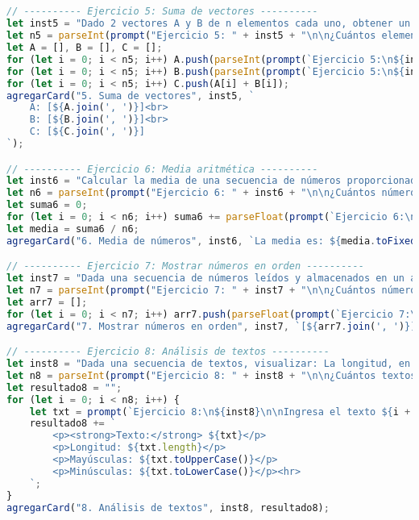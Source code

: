 \documentclass[10pt,a4paper]{article}
\begin{document}
\subsection{\color{colorESCOM}{Código JavaScript (Parte 2)}}
\begin{lstlisting}[language=JavaScript]
// ---------- Ejercicio 5: Suma de vectores ----------
let inst5 = "Dado 2 vectores A y B de n elementos cada uno, obtener un arreglo C con A[i] + B[i].";
let n5 = parseInt(prompt("Ejercicio 5: " + inst5 + "\n\n¿Cuántos elementos tendrán los vectores?"));
let A = [], B = [], C = [];
for (let i = 0; i < n5; i++) A.push(parseInt(prompt(`Ejercicio 5:\n${inst5}\n\nVector A - Elemento ${i + 1}:`)));
for (let i = 0; i < n5; i++) B.push(parseInt(prompt(`Ejercicio 5:\n${inst5}\n\nVector B - Elemento ${i + 1}:`)));
for (let i = 0; i < n5; i++) C.push(A[i] + B[i]);
agregarCard("5. Suma de vectores", inst5, `
    A: [${A.join(', ')}]<br>
    B: [${B.join(', ')}]<br>
    C: [${C.join(', ')}]
`);

// ---------- Ejercicio 6: Media aritmética ----------
let inst6 = "Calcular la media de una secuencia de números proporcionada por el usuario.";
let n6 = parseInt(prompt("Ejercicio 6: " + inst6 + "\n\n¿Cuántos números vas a ingresar?"));
let suma6 = 0;
for (let i = 0; i < n6; i++) suma6 += parseFloat(prompt(`Ejercicio 6:\n${inst6}\n\nIngresa el número ${i + 1}:`));
let media = suma6 / n6;
agregarCard("6. Media de números", inst6, `La media es: ${media.toFixed(2)}`);

// ---------- Ejercicio 7: Mostrar números en orden ----------
let inst7 = "Dada una secuencia de números leídos y almacenados en un arreglo [A], mostrar dichos números en orden.";
let n7 = parseInt(prompt("Ejercicio 7: " + inst7 + "\n\n¿Cuántos números vas a ingresar?"));
let arr7 = [];
for (let i = 0; i < n7; i++) arr7.push(parseFloat(prompt(`Ejercicio 7:\n${inst7}\n\nIngresa el número ${i + 1}:`)));
agregarCard("7. Mostrar números en orden", inst7, `[${arr7.join(', ')}]`);

// ---------- Ejercicio 8: Análisis de textos ----------
let inst8 = "Dada una secuencia de textos, visualizar: La longitud, en mayúsculas y en minúsculas.";
let n8 = parseInt(prompt("Ejercicio 8: " + inst8 + "\n\n¿Cuántos textos vas a ingresar?"));
let resultado8 = "";
for (let i = 0; i < n8; i++) {
    let txt = prompt(`Ejercicio 8:\n${inst8}\n\nIngresa el texto ${i + 1}:`);
    resultado8 += `
        <p><strong>Texto:</strong> ${txt}</p>
        <p>Longitud: ${txt.length}</p>
        <p>Mayúsculas: ${txt.toUpperCase()}</p>
        <p>Minúsculas: ${txt.toLowerCase()}</p><hr>
    `;
}
agregarCard("8. Análisis de textos", inst8, resultado8);
\end{lstlisting}
\end{document}
